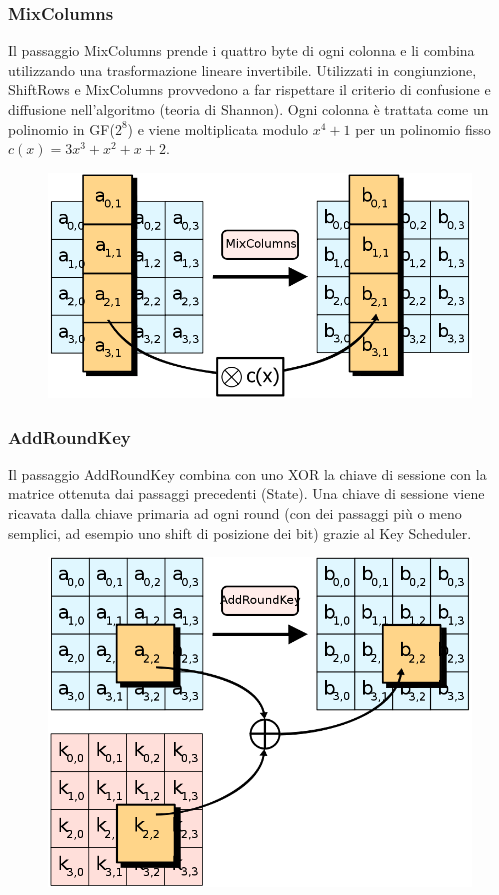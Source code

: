 \documentclass[10pt,a4paper]{article}
\begin{document}
\subsubsection{MixColumns}
Il passaggio MixColumns prende i quattro byte di ogni colonna e li combina utilizzando una trasformazione lineare invertibile. Utilizzati in congiunzione, ShiftRows e MixColumns provvedono a far rispettare il criterio di confusione e diffusione nell'algoritmo (teoria di Shannon). Ogni colonna è trattata come un polinomio in GF($2^8$) e viene moltiplicata modulo $x^4+1$ per un polinomio fisso $c(x)=3x^3+x^2+x+2$.
\begin{figure}[htbp]
\includegraphics[scale=0.4]{immagini/MixColumns.png}
\end{figure}

\subsubsection{AddRoundKey}
Il passaggio AddRoundKey combina con uno XOR la chiave di sessione con la matrice ottenuta dai passaggi precedenti (State). Una chiave di sessione viene ricavata dalla chiave primaria ad ogni round (con dei passaggi più o meno semplici, ad esempio uno shift di posizione dei bit) grazie al Key Scheduler.
\begin{figure}[htbp]
\includegraphics[scale=0.4]{immagini/AddRoundKey.png}
\end{figure}
\end{document}
